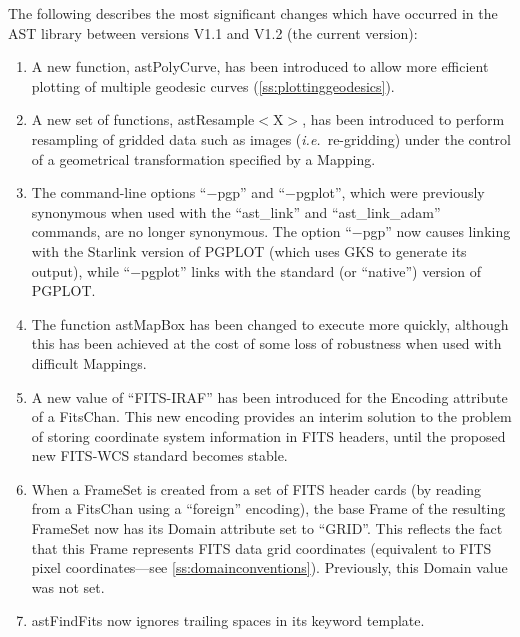 \documentclass[twoside,11pt]{article}
\newcommand{\htmlref}[2]{#1}
\newcommand{\secref}[1]{\S\ref{#1}}
\renewcommand{\secref}[1]{\ref{#1}}
\begin{document}
The following describes the most significant changes which have
occurred in the AST library between versions V1.1 and V1.2 (the
current version):

\begin{enumerate}
\item A new function, \htmlref{astPolyCurve}{astPolyCurve}, has been introduced to allow more
efficient plotting of multiple geodesic curves
(\secref{ss:plottinggeodesics}).

\item A new set of functions, \htmlref{astResample$<$X$>$}{astResampleX}, has been introduced
to perform resampling of gridded data such as images
({\em{i.e.}}\ re-gridding) under the control of a geometrical
transformation specified by a \htmlref{Mapping}{Mapping}.

\item The command-line options ``$-$pgp'' and ``$-$pgplot'', which
were previously synonymous when used with the ``\htmlref{ast\_link}{ast_link}'' and
``\htmlref{ast\_link\_adam}{ast_link_adam}'' commands, are no longer synonymous. The option
``$-$pgp'' now causes linking with the Starlink version of PGPLOT
(which uses GKS to generate its output), while ``$-$pgplot'' links
with the standard (or ``native'') version of PGPLOT.

\item The function \htmlref{astMapBox}{astMapBox} has been changed to execute more quickly,
although this has been achieved at the cost of some loss of robustness
when used with difficult Mappings.

\item A new value of ``FITS-IRAF'' has been introduced for the
\htmlref{Encoding}{Encoding} attribute of a \htmlref{FitsChan}{FitsChan}. This new encoding provides an
interim solution to the problem of storing coordinate system
information in FITS headers, until the proposed new FITS-WCS standard
becomes stable.

\item When a \htmlref{FrameSet}{FrameSet} is created from a set of FITS header cards (by
reading from a FitsChan using a ``foreign'' encoding), the base \htmlref{Frame}{Frame}
of the resulting FrameSet now has its \htmlref{Domain}{Domain} attribute set to
``GRID''. This reflects the fact that this Frame represents FITS data
grid coordinates (equivalent to FITS pixel coordinates---see
\secref{ss:domainconventions}). Previously, this Domain value was not
set.

\item \htmlref{astFindFits}{astFindFits} now ignores trailing spaces in its keyword template.


\end{enumerate}
\end{document}
